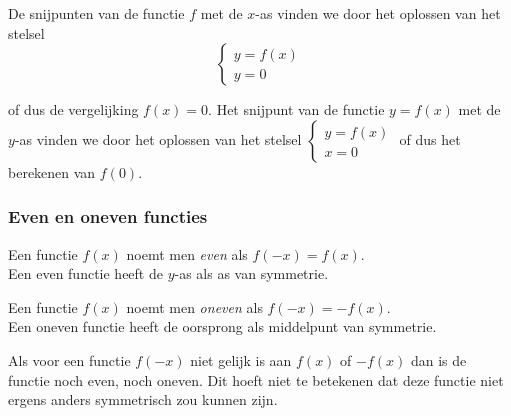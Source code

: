 De snijpunten van de functie $f$ met de $x$-as vinden
we door het oplossen van het stelsel
\begin{equation*}
\begin{cases}
y=f(x)\\
y=0
\end{cases}
\end{equation*}


 of dus de vergelijking $f(x)=0$. Het snijpunt van de functie $y=f(x)$ met de $y$-as vinden
we door het oplossen van het stelsel 
$\begin{cases}
y=f(x)\\
x=0
\end{cases}$ of dus het berekenen van $f(0)$.


%
%
%


\subsubsection{Even en oneven functies}


\begin{definitie}
	Een functie $f(x)$ noemt men \emph{even} als $f(-x)=f(x)$.
\\
Een even functie heeft de $y$-as als as van symmetrie.


Een functie $f(x)$ noemt men \emph{oneven} als $f(-x)=-f(x)$.
\\
Een oneven functie heeft de oorsprong als middelpunt van symmetrie.

\end{definitie}

Als voor een functie $f(-x)$ niet gelijk is aan $f(x)$
of $-f(x)$ dan is de functie noch even, noch oneven. Dit hoeft niet
te betekenen dat deze functie niet ergens anders symmetrisch zou kunnen
zijn.




